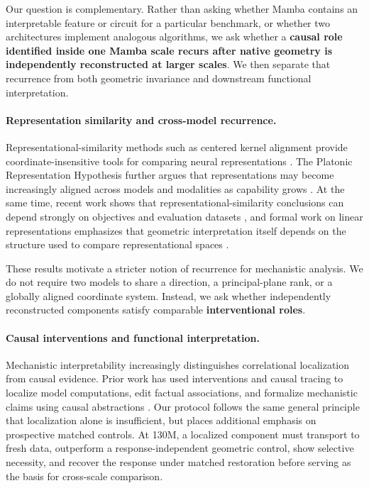 \documentclass{article}
\begin{document}
Our question is complementary. Rather than asking whether Mamba contains an interpretable feature or circuit for a particular benchmark, or whether two architectures implement analogous algorithms, we ask whether a \textbf{causal role identified inside one Mamba scale recurs after native geometry is independently reconstructed at larger scales}. We then separate that recurrence from both geometric invariance and downstream functional interpretation.

\paragraph{Representation similarity and cross-model recurrence.}

Representational-similarity methods such as centered kernel alignment provide coordinate-insensitive tools for comparing neural representations \citep{kornblith2019cka}. The Platonic Representation Hypothesis further argues that representations may become increasingly aligned across models and modalities as capability grows \citep{huh2024platonic}. At the same time, recent work shows that representational-similarity conclusions can depend strongly on objectives and evaluation datasets \citep{ciernik2025objective}, and formal work on linear representations emphasizes that geometric interpretation itself depends on the structure used to compare representational spaces \citep{park2024linear}.

These results motivate a stricter notion of recurrence for mechanistic analysis. We do not require two models to share a direction, a principal-plane rank, or a globally aligned coordinate system. Instead, we ask whether independently reconstructed components satisfy comparable \textbf{interventional roles}.

\paragraph{Causal interventions and functional interpretation.}

Mechanistic interpretability increasingly distinguishes correlational localization from causal evidence. Prior work has used interventions and causal tracing to localize model computations, edit factual associations, and formalize mechanistic claims using causal abstractions \citep{dai2022knowledge,meng2022rome,geiger2023causal}. Our protocol follows the same general principle that localization alone is insufficient, but places additional emphasis on prospective matched controls. At 130M, a localized component must transport to fresh data, outperform a response-independent geometric control, show selective necessity, and recover the response under matched restoration before serving as the basis for cross-scale comparison.
\end{document}

